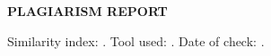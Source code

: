 \begin{center}
  {\LARGE \textbf{PLAGIARISM REPORT}}\\[1cm]
\end{center}
\noindent Similarity index: . Tool used: . Date of check: .

\vspace{1cm}
\noindent{}
